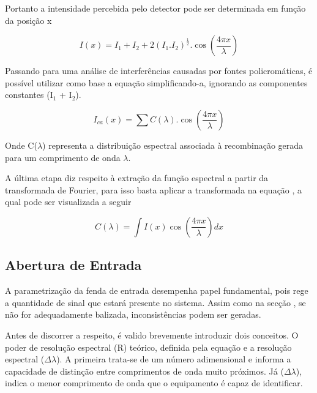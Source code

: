 \documentclass[oneside,openright,12pt]{ufsm_2021} %
\begin{document}
    \par Portanto a intensidade percebida pelo detector pode ser determinada em função da posição x 

    \begin{equation}
        I(x) = I_1 + I_2 + 2(I_1.I_2)^{\frac{1}{2}}.\cos(\frac{4\pi x}{\lambda})  
    \end{equation}

    \par Passando para uma análise de interferências causadas por fontes policromáticas, é possível utilizar como base a equação \cite{Eq?} simplificando-a, ignorando as componentes constantes (I$_1$ + I$_2$).

    \begin{equation}
        I_{ca}(x)=\sum C(\lambda).\cos(\frac{4\pi x}{\lambda})
    \end{equation}

    \par Onde C($\lambda$) representa a distribuição espectral associada à recombinação gerada para um comprimento de onda $\lambda$.

    \par A última etapa diz respeito à extração da função espectral a partir da transformada de Fourier, para isso basta aplicar a transformada na equação \cite{Eq?} \cite{Livro1}, a qual pode ser visualizada a seguir

    \begin{equation}
        C(\lambda) = \int I(x)\cos(\frac{4\pi x}{\lambda})dx  
    \end{equation}

    \subsection{Abertura de Entrada}

    \par A parametrização da fenda de entrada desempenha papel fundamental, pois rege a quantidade de sinal que estará presente no sistema. Assim como na secção \cite{2.2.1}, se não for adequadamente balizada, inconsistências podem ser geradas.
    
    \par Antes de discorrer a respeito, é valido brevemente introduzir dois conceitos. O poder de resolução espectral (R) teórico, definida pela equação \cite{Eq5} e a resolução espectral ($\Delta$$\lambda$). A primeira trata-se de um número adimensional e informa a capacidade de distinção entre comprimentos de onda muito próximos. Já ($\Delta$$\lambda$), indica o menor comprimento de onda que o equipamento é capaz de identificar.
\end{document}
